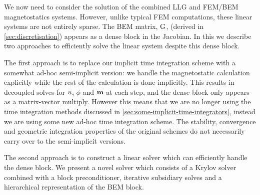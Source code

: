 


We now need to consider the solution of the combined LLG and FEM/BEM magnetostatics systems.
However, unlike typical FEM computations, these linear systems are not entirely sparse.
The BEM matrix, ${\mathbf{\mathrm{G}}}$, (derived in \cref{sec:discretisation}) appears as a dense block in the Jacobian.
In this  we describe two approaches to efficiently solve the linear system despite this dense block.



The first approach is to replace our implicit time integration scheme with a somewhat ad-hoc semi-implicit version: we handle the magnetostatic calculation explicitly while the rest of the calculation is done implicitly.
This results in decoupled solves for $u$, $\phi$ and $\boldsymbol{\mathrm{m}}$ at each step, and the dense block only appears as a matrix-vector multiply.
However this means that we are no longer using the time integration methods discussed in \cref{sec:some-implicit-time-integrators}, instead we are using some new ad-hoc time integration scheme.
The stability, convergence and geometric integration properties of the original schemes do not necessarily carry over to the semi-implicit versions.

The second approach is to construct a linear solver which can efficiently handle the dense block.
We present a novel solver which consists of a Krylov solver combined with a block preconditioner, iterative subsidiary solves and a hierarchical representation of the BEM block.



